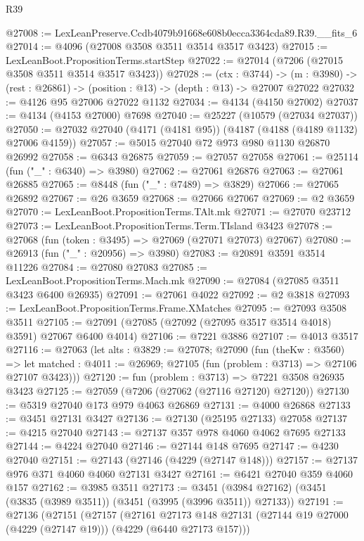 \begin{lexlean}{R39}
\begin{coremodule}
@27008 := LexLeanPreserve.Ccdb4079b91668e608b0ecca3364cda89.R39.__fits_6
@27014 := @4096 (@27008 @3508 @3511 @3514 @3517 @3423)
@27015 := LexLeanBoot.PropositionTerms.startStep
@27022 := @27014 (@7206 (@27015 @3508 @3511 @3514 @3517 @3423))
@27028 := (ctx : @3744) ->
  (m : @3980) -> (rest : @26861) -> (position : @13) -> (depth : @13) -> @27007 @27022
@27032 := @4126 @95 @27006 @27022 @1132
@27034 := @4134 (@4150 @27002)
@27037 := @4134 (@4153 @27000) @7698
@27040 := @25227 (@10579 (@27034 @27037))
@27050 := @27032 @27040 (@4171 (@4181 @95)) (@4187 (@4188 (@4189 @1132) @27006 @4159))
@27057 := @5015 @27040 @72 @973 @980 @1130 @26870 @26992
@27058 := @6343 @26875
@27059 := @27057 @27058
@27061 := @25114 (fun ("_" : @6340) => @3980)
@27062 := @27061 @26876
@27063 := @27061 @26885
@27065 := @8448 (fun ("_" : @7489) => @3829)
@27066 := @27065 @26892
@27067 := @26 @3659
@27068 := @27066 @27067
@27069 := @2 @3659
@27070 := LexLeanBoot.PropositionTerms.TAlt.mk
@27071 := @27070 @23712
@27073 := LexLeanBoot.PropositionTerms.Term.TIsland @3423
@27078 := @27068 (fun (token : @3495) => @27069 (@27071 @27073) @27067)
@27080 := @26913 (fun ("_" : @20956) => @3980)
@27083 := @20891 @3591 @3514 @11226
@27084 := @27080 @27083
@27085 := LexLeanBoot.PropositionTerms.Mach.mk
@27090 := @27084 (@27085 @3511 @3423 @6400 @26935)
@27091 := @27061 @4022
@27092 := @2 @3818
@27093 := LexLeanBoot.PropositionTerms.Frame.XMatches
@27095 := @27093 @3508 @3511
@27105 := @27091 (@27085 (@27092 (@27095 @3517 @3514 @4018) @3591) @27067 @6400 @4014)
@27106 := @7221 @3886
@27107 := @4013 @3517
@27116 := @27063
    (let alts : @3829 := @27078;
    @27090
      (fun (theKw : @3560) =>
      let matched : @4011 := @26969; @27105 (fun (problem : @3713) => @27106 @27107 @3423)))
@27120 := fun (problem : @3713) => @7221 @3508 @26935 @3423
@27125 := @27059 (@7206 (@27062 (@27116 @27120) @27120))
@27130 := @5319 @27040 @173 @979 @4063 @26869
@27131 := @4000 @26868
@27133 := @3451 @27131 @3427
@27136 := @27130 (@25195 @27133) @27058
@27137 := @4215 @27040
@27143 := @27137 @357 @978 @4060 @4062 @7695 @27133
@27144 := @4224 @27040
@27146 := @27144 @148 @7695
@27147 := @4230 @27040
@27151 := @27143 (@27146 (@4229 (@27147 @148)))
@27157 := @27137 @976 @371 @4060 @4060 @27131 @3427
@27161 := @6421 @27040 @359 @4060 @157
@27162 := @3985 @3511
@27173 := @3451 (@3984 @27162) (@3451 (@3835 (@3989 @3511)) (@3451 (@3995 (@3996 @3511)) @27133))
@27191 := @27136
    (@27151
      (@27157
        (@27161
          @27173
          @148
          @27131
          (@27144 @19 @27000 (@4229 (@27147 @19)))
          (@4229 (@6440 @27173 @157)))

\end{coremodule}
\end{lexlean}

